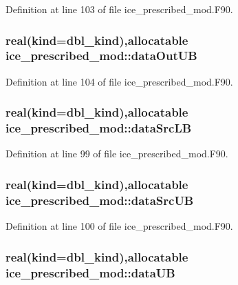 Definition at line 103 of file ice\_\-prescribed\_\-mod.F90.\hypertarget{namespaceice__prescribed__mod_a0c216149ad3a2a7bd66c3bdb274c77e7}{
\subsubsection[{dataOutUB}]{\setlength{\rightskip}{0pt plus 5cm}real(kind=dbl\_\-kind),allocatable {\bf ice\_\-prescribed\_\-mod::dataOutUB}}}
\label{namespaceice__prescribed__mod_a0c216149ad3a2a7bd66c3bdb274c77e7}


Definition at line 104 of file ice\_\-prescribed\_\-mod.F90.\hypertarget{namespaceice__prescribed__mod_a14513a8e50e8321ddac9e3f9d091cd12}{
\subsubsection[{dataSrcLB}]{\setlength{\rightskip}{0pt plus 5cm}real(kind=dbl\_\-kind),allocatable {\bf ice\_\-prescribed\_\-mod::dataSrcLB}}}
\label{namespaceice__prescribed__mod_a14513a8e50e8321ddac9e3f9d091cd12}


Definition at line 99 of file ice\_\-prescribed\_\-mod.F90.\hypertarget{namespaceice__prescribed__mod_a59169c4d93914baf69c59b8d5f2fb1ab}{
\subsubsection[{dataSrcUB}]{\setlength{\rightskip}{0pt plus 5cm}real(kind=dbl\_\-kind),allocatable {\bf ice\_\-prescribed\_\-mod::dataSrcUB}}}
\label{namespaceice__prescribed__mod_a59169c4d93914baf69c59b8d5f2fb1ab}


Definition at line 100 of file ice\_\-prescribed\_\-mod.F90.\hypertarget{namespaceice__prescribed__mod_a6cbaf1dd947b14ebfe7fee398952dd6b}{
\subsubsection[{dataUB}]{\setlength{\rightskip}{0pt plus 5cm}real(kind=dbl\_\-kind),allocatable {\bf ice\_\-prescribed\_\-mod::dataUB}}}
\label{namespaceice__prescribed__mod_a6cbaf1dd947b14ebfe7fee398952dd6b}


